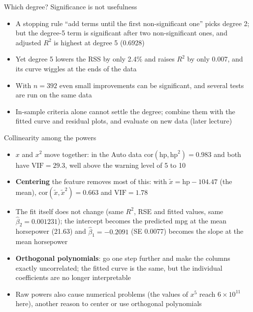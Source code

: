 \begin{frame}{Which degree? Significance is not usefulness}
    \begin{itemize}
        \item A stopping rule ``add terms until the first non-significant one'' picks degree 2; but the degree-5 term is significant after two non-significant ones, and adjusted $R^2$ is highest at degree 5 (0.6928)
        \item Yet degree 5 lowers the RSS by only 2.4\% and raises $R^2$ by only 0.007, and its curve wiggles at the ends of the data
        \item With $n = 392$ even small improvements can be significant, and several tests are run on the same data
        \item In-sample criteria alone cannot settle the degree; combine them with the fitted curve and residual plots, and evaluate on new data (later lecture)
    \end{itemize}
\end{frame}


\begin{frame}{Collinearity among the powers}
    \begin{itemize}
        \item $x$ and $x^2$ move together: in the Auto data $\mathrm{cor}(\text{hp}, \text{hp}^2) = 0.983$ and both have $\mathrm{VIF} = 29.3$, well above the warning level of 5 to 10
        \item \textbf{Centering} the feature removes most of this: with $\tilde{x} = \text{hp} - 104.47$ (the mean), $\mathrm{cor}(\tilde{x}, \tilde{x}^2) = 0.663$ and $\mathrm{VIF} = 1.78$
        \item The fit itself does not change (same $R^2$, RSE and fitted values, same $\hat\beta_2 = 0.001231$); the intercept becomes the predicted mpg at the mean horsepower (21.63) and $\hat\beta_1 = -0.2091$ (SE 0.0077) becomes the slope at the mean horsepower
        \item \textbf{Orthogonal polynomials}: go one step further and make the columns exactly uncorrelated; the fitted curve is the same, but the individual coefficients are no longer interpretable
        \item Raw powers also cause numerical problems (the values of $x^5$ reach $6 \times 10^{11}$ here), another reason to center or use orthogonal polynomials
    \end{itemize}
\end{frame}


